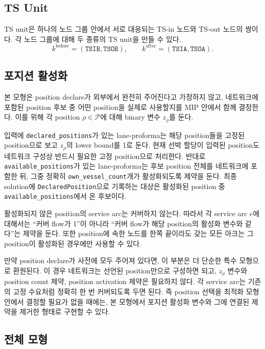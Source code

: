 \documentclass[11pt]{article}
\newcommand{\Positions}{\mathcal{P}}
\begin{document}
\subsection{TS Unit}

TS unit은 하나의 노드 그룹 안에서 서로 대응되는 TS-in 노드와 TS-out 노드의 쌍이다.
각 노드 그룹에 대해 두 종류의 TS unit을 만들 수 있다.
\[
  k^{\mathrm{before}}=(\texttt{TSIB},\texttt{TSOB}),
  \qquad
  k^{\mathrm{after}}=(\texttt{TSIA},\texttt{TSOA}).
\]

\subsection{포지션 활성화}

본 모형은 position declare가 외부에서 완전히 주어진다고 가정하지 않고, 네트워크에
포함된 position 후보 중 어떤 position을 실제로 사용할지를 MIP 안에서 함께
결정한다. 이를 위해 각 position $\rho\in\Positions$에 대해 binary 변수
$z_\rho$를 둔다.

입력에 \texttt{declared\_positions}가 있는 lane-proforma는 해당 position들을
고정된 position으로 보고 $z_\rho$의 lower bound를 1로 둔다. 현재 선박 할당이
입력된 position도 네트워크 구성상 반드시 필요한 고정 position으로 처리한다.
반대로 \texttt{available\_positions}가 있는 lane-proforma는 후보 position 전체를
네트워크에 포함한 뒤, 그중 정확히 \texttt{own\_vessel\_count}개가 활성화되도록
제약을 둔다. 최종 solution에 \texttt{DeclaredPosition}으로 기록하는 대상은
활성화된 position 중 \texttt{available\_positions}에서 온 후보이다.

활성화되지 않은 position의 service arc는 커버하지 않는다. 따라서 각 service arc
$e$에 대해서는 ``커버 flow가 1''이 아니라 ``커버 flow가 해당 position의 활성화
변수와 같다''는 제약을 둔다. 또한 position에 속한 노드를 한쪽 끝이라도 갖는 모든
아크는 그 position이 활성화된 경우에만 사용할 수 있다.

만약 position declare가 사전에 모두 주어져 있다면, 이 부분은 더 단순한 특수
모형으로 환원된다. 이 경우 네트워크는 선언된 position만으로 구성하면 되고,
$z_\rho$ 변수와 position count 제약, position activation 제약은 필요하지 않다.
각 service arc는 기존의 고정 수요처럼 정확히 한 번 커버되도록 두면 된다. 즉
position 선택을 최적화 모형 안에서 결정할 필요가 없을 때에는, 본 모형에서
포지션 활성화 변수와 그에 연결된 제약을 제거한 형태로 구현할 수 있다.

\subsection{전체 모형}
\end{document}
